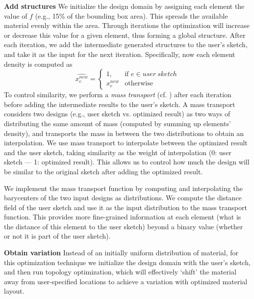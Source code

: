 \textbf{Add structures} \hspace{0.1cm}
We initialize the design domain by assigning each element the value of $f$
(e.g., 15\% of the bounding box area). This spreads the available material evenly within the area. Through iterations the optimization will increase or decrease this value for a given element, thus forming a global structure. After each iteration, we add the intermediate generated structures to the user's sketch, and take it as the input for the next iteration. Specifically, now each element density is computed as
\begin{equation}
    \widehat {x_e^{new}}= 
\begin{cases}
    1,          & \text{if } e \in user~sketch\\
    x_e^{new}	& \text{otherwise}
\end{cases}
\end{equation}
To control similarity, we perform a \textit{mass transport} (cf. \cite{bonneel2011displacement}) after each iteration before adding the intermediate results to the user's sketch. A mass transport considers two designs (e.g., user sketch vs. optimized result) as two ways of distributing the same amount of mass (computed by summing up elements' density), and transports the mass in between the two distributions to obtain an interpolation. We use mass transport to interpolate between the optimized result and the user sketch, taking similarity as the weight of interpolation (0: user sketch --- 1: optimized result). This allows us to control how much the design will be similar to the original sketch after adding the optimized result.

We implement the mass transport function by computing and interpolating the barycenters of the two input designs as distributions. We compute the distance field of the user sketch and use it as the input distribution to the mass transport function. This provides more fine-grained information at each element (what is the distance of this element to the user sketch) beyond a binary value (whether or not it is part of the user sketch).

\textbf{Obtain variation} \hspace{0.1cm}
Instead of an initially uniform distribution of material, for this optimization technique we initialize the design domain with the user's sketch, and then run topology optimization, which will effectively `shift' the material away from user-specified locations to achieve a variation with optimized material layout.

